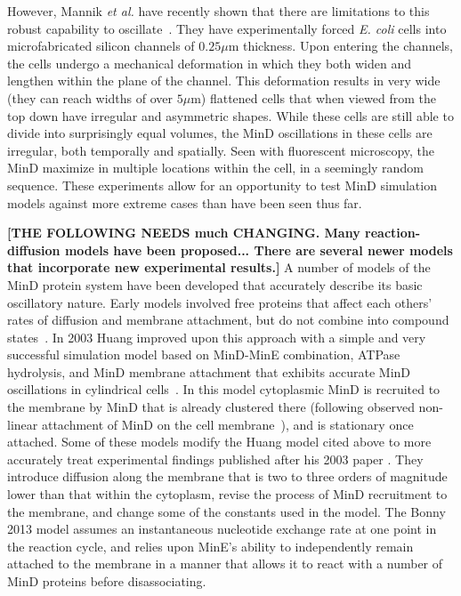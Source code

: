 \documentclass[10pt,letterpaper]{article}
\newcommand\micron{\ensuremath{\mu\text{m}}}
\newcommand{\red}[1]{{\bf \color{red} #1}}
\newcommand{\fixme}[1]{\red{[#1]}}
\begin{document}
However, Mannik \emph{et al.} have recently shown that there are
limitations to this robust capability to
oscillate~\cite{mannik2010bacteria, mannik2009bacterial}. They have
experimentally forced \emph{E. coli} cells into microfabricated
silicon channels of $0.25\micron$ thickness. Upon entering the
channels, the cells undergo a mechanical deformation in which they
both widen and lengthen within the plane of the channel.  This
deformation results in very wide (they can reach widths of over
$5\micron$) flattened cells that when viewed from the top down have
irregular and asymmetric shapes.  While these cells are still able to
divide into surprisingly equal volumes, the MinD oscillations in these
cells are irregular, both temporally and spatially. Seen with
fluorescent microscopy, the MinD maximize in multiple locations within
the cell, in a seemingly random sequence. These experiments allow for
an opportunity to test MinD simulation models against more extreme
cases than have been seen thus far.

\fixme{THE FOLLOWING NEEDS much CHANGING.  Many reaction-diffusion
  models have been proposed... There are several newer models that
  incorporate new experimental results.}
%
A number of models of the MinD protein system have been developed that
accurately describe its basic oscillatory nature.
%
Early models involved free proteins that affect each others' rates of
diffusion and membrane attachment, but do not combine into compound
states~\cite{meinhardt2001pattern}.  In 2003 Huang improved upon this
approach with a simple and very successful simulation model based on
MinD-MinE combination, ATPase hydrolysis, and MinD membrane attachment
that exhibits accurate MinD oscillations in cylindrical
cells~\cite{huang2003dynamic}. In this model cytoplasmic MinD is
recruited to the membrane by MinD that is already clustered there
(following observed non-linear attachment of MinD on the cell
membrane~\cite{hu2002dynamic,shih2002division}), and is stationary
once attached.
%
Some of these models
\cite{fange2006noise,bonny2013membrane,halatek2012highly} modify the
Huang model cited above to more accurately treat experimental findings
published after his 2003 paper \cite{Meacci2007,Loose2011}. They
introduce diffusion along the membrane that is two to three orders of
magnitude lower than that within the cytoplasm, revise the process of
MinD recruitment to the membrane, and change some of the constants
used in the model. The Bonny 2013 model assumes an instantaneous
nucleotide exchange rate at one point in the reaction cycle, and
relies upon MinE’s ability to independently remain attached to the
membrane in a manner that allows it to react with a number of MinD
proteins before disassociating.
%
\end{document}
